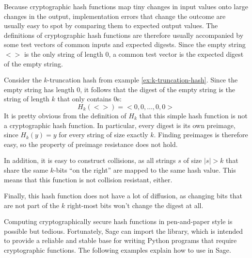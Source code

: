 Because cryptographic hash functions map tiny changes in input values onto large changes in the output, implementation errors that change the outcome are usually easy to spot by comparing them to expected output values. The definitions of cryptographic hash functions are therefore usually accompanied by some test vectors of common inputs and expected digests. Since the empty string $<>$ is the only string of length $0$, a common test vector is the expected digest of the empty string.
\begin{example} Consider the $k$-truncation hash from example \ref{ex:k-truncation-hash}. Since the empty string has length $0$, it follows that the digest of the empty string is the string of length $k$ that only contains $0$s:
\begin{equation}
H_k(<>)= <0,0,\ldots, 0,0>
\end{equation}
It is pretty obvious from the definition of $H_k$ that this simple hash function is not a cryptographic hash function. In particular, every digest is its own preimage, since $H_k(y)=y$ for every string of size exactly $k$. Finding preimages is therefore easy, so the property of preimage resistance does not hold.

In addition, it is easy to construct collisions, as all strings $s$ of size $|s|>k$ that share the same $k$-bits ``on the right'' are mapped to the same hash value. This means that this function is not collision resistant, either.

Finally, this hash function does not have a lot of diffusion, as changing bits that are not part of the $k$ right-most bits won't change the digest at all.
\end{example}

Computing cryptographically secure hash functions in pen-and-paper style is possible but tedious. Fortunately, Sage can import the  library, which is intended to provide a reliable and stable base for writing Python programs that require cryptographic functions. The following examples explain how to use  in Sage.

